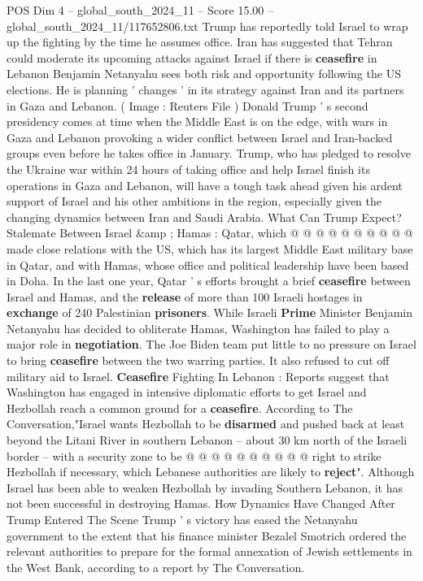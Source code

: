 \begin{textsample}{POS Dim 4 – global\_south\_2024\_11 – Score 15.00 – global\_south\_2024\_11/117652806.txt}  \label{ex:f4_pos_287}
Trump has reportedly told Israel to wrap up the fighting by the time he assumes office.
Iran has suggested that Tehran could moderate its upcoming attacks against Israel if there is \textbf{ceasefire} in Lebanon Benjamin Netanyahu sees both risk and opportunity following the US elections.
He is planning ' changes ' in its strategy against Iran and its partners in Gaza and Lebanon. ( Image : Reuters File ) Donald Trump ' s second presidency comes at time when the Middle East is on the edge, with wars in Gaza and Lebanon provoking a wider conflict between Israel and Iran-backed groups even before he takes office in January.
Trump, who has pledged to resolve the Ukraine war within 24 hours of taking office and help Israel finish its operations in Gaza and Lebanon, will have a tough task ahead given his ardent support of Israel and his other ambitions in the region, especially given the changing dynamics between Iran and Saudi Arabia.
What Can Trump Expect?
Stalemate Between Israel \&amp ; Hamas : Qatar, which @ @ @ @ @ @ @ @ @ @ made close relations with the US, which has its largest Middle East military base in Qatar, and with Hamas, whose office and political leadership have been based in Doha.
In the last one year, Qatar ' s efforts brought a brief \textbf{ceasefire} between Israel and Hamas, and the \textbf{release} of more than 100 Israeli hostages in \textbf{exchange} of 240 Palestinian \textbf{prisoners}.
While Israeli \textbf{Prime} Minister Benjamin Netanyahu has decided to obliterate Hamas, Washington has failed to play a major role in \textbf{negotiation}.
The Joe Biden team put little to no pressure on Israel to bring \textbf{ceasefire} between the two warring parties.
It also refused to cut off military aid to Israel. \textbf{Ceasefire} Fighting In Lebanon : Reports suggest that Washington has engaged in intensive diplomatic efforts to get Israel and Hezbollah reach a common ground for a \textbf{ceasefire}.
According to The Conversation,"Israel wants Hezbollah to be \textbf{disarmed} and pushed back at least beyond the Litani River in southern Lebanon -- about 30 km north of the Israeli border -- with a security zone to be @ @ @ @ @ @ @ @ @ @ right to strike Hezbollah if necessary, which Lebanese authorities are likely to \textbf{reject}".
Although Israel has been able to weaken Hezbollah by invading Southern Lebanon, it has not been successful in destroying Hamas.
How Dynamics Have Changed After Trump Entered The Scene Trump ' s victory has eased the Netanyahu government to the extent that his finance minister Bezalel Smotrich ordered the relevant authorities to prepare for the formal annexation of Jewish settlements in the West Bank, according to a report by The Conversation.

\end{textsample}
